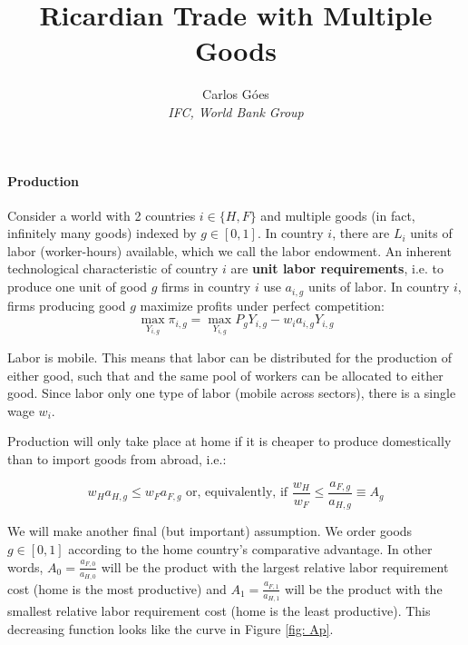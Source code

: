 \documentclass[11pt,letterpaper]{article}
\begin{document}
\title{\textbf{Ricardian Trade with Multiple Goods}}
\author{\large%
\setcounter{footnote}{0}%
Carlos G\'{o}es \\[-3pt] \textit{\small IFC, World Bank Group}
}
\maketitle

\paragraph{Production} Consider a world with 2 countries $i \in \{ H, F\}$ and multiple goods (in fact, infinitely many goods) indexed by $g \in [0,1]$. In country $i$, there are $L_i$ units of labor (worker-hours) available, which we call the labor endowment. An inherent technological characteristic of country $i$ are \textbf{unit labor requirements}, i.e. to produce one unit of good $g$ firms in country $i$ use $a_{i,g}$ units of labor. In country $i$, firms producing good $g$ maximize profits under perfect competition:
        \begin{equation}\label{eq: production}
            \max_{Y_{i,g}} \pi_{i,g} = \max_{Y_{i,g}} P_{g}Y_{i,g} - w_i a_{i,g} Y_{i,g} 
        \end{equation}

Labor is mobile. This means that labor can be distributed for the production of either good, such that and the same pool of workers can be allocated to either good. Since labor only one type of labor (mobile across sectors), there is a single wage $w_i$.

Production will only take place at home if it is cheaper to produce domestically than to import goods from abroad, i.e.: 

    \begin{equation*}
        w_H a_{H,g} \le w_F a_{F,g} \text{ or, equivalently, if } \frac{w_H}{w_F} \le  \frac{a_{F,g}}{a_{H,g}} \equiv A_g
    \end{equation*}

We will make another final (but important) assumption. We order goods $g \in [0,1]$ according to the home country's comparative advantage. In other words, $A_0= \frac{a_{F,0}}{a_{H,0}}$ will be the product with the largest relative labor requirement cost (home is the most productive) and $A_1= \frac{a_{F,1}}{a_{H,1}}$ will be the product with the smallest relative labor requirement cost (home is the least productive). This decreasing function looks like the curve in Figure \ref{fig: Ap}.
\end{document}
